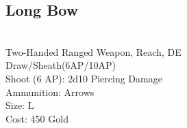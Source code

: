 \subsection{Long Bow}\label{weapon:longBow}\\
Two-Handed Ranged Weapon,  Reach, DE\\
Draw/Sheath(6AP/10AP)\\
Shoot (6 AP): 2d10 Piercing Damage\\
Ammunition: Arrows\\
Size: L\\
Cost: 450 Gold\\